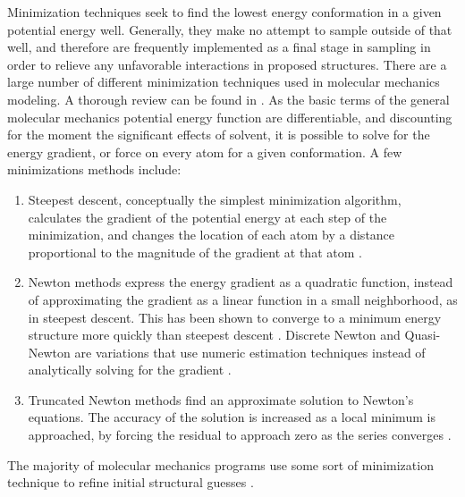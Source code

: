 Minimization techniques seek to find the lowest energy conformation in a given potential energy well.
Generally, they make no attempt to sample outside of that well, and therefore are frequently implemented as a final stage in sampling in order to relieve any unfavorable interactions in proposed structures.
There are a large number of different minimization techniques used in molecular mechanics modeling.
A thorough review can be found in \cite{schlick2010molecular}.
As the basic terms of the general molecular mechanics potential energy function are differentiable, and discounting for the moment the significant effects of solvent, it is possible to solve for the energy gradient, or force on every atom for a given conformation.
A few minimizations methods include:
\begin{enumerate}
\item Steepest descent, conceptually the simplest minimization algorithm, calculates the gradient of the potential energy at each step of the minimization, and changes the location of each atom by a distance proportional to the magnitude of the gradient at that atom \cite{levitt1969refinement,bixon1967potential}.
\item Newton methods express the energy gradient as a quadratic function, instead of approximating the gradient as a linear function in a small neighborhood, as in steepest descent.
This has been shown to converge to a minimum energy structure more quickly than steepest descent \cite{ponder1987efficient}.  
Discrete Newton and Quasi-Newton are variations that use numeric estimation techniques instead of analytically solving for the gradient \cite{schlick2010molecular}.
\item Truncated Newton methods find an approximate solution to Newton's equations.
The accuracy of the solution is increased as a local minimum is approached, by forcing the residual to approach zero as the series converges \cite{dembo1983truncated}.
\end{enumerate}

The majority of molecular mechanics programs use some sort of minimization technique to refine initial structural guesses \cite{ponder1987efficient,levitt1969refinement,bixon1967potential,zhu2007multiscale}.



